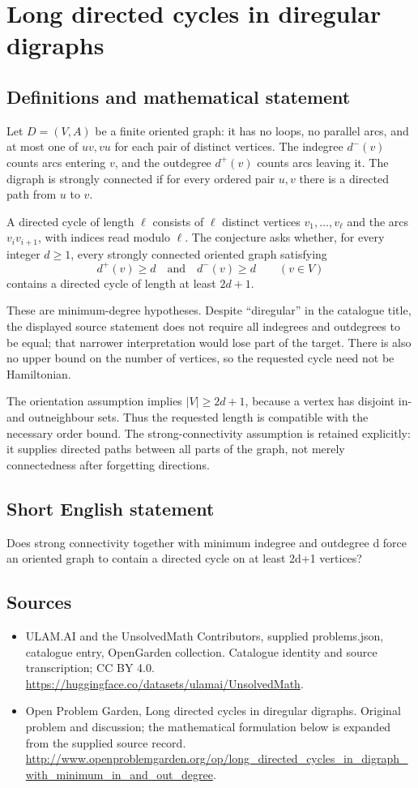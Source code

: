\documentclass[11pt,a4paper]{article}
\begin{document}
\section*{Long directed cycles in diregular digraphs}\label{statement}

\subsection{Definitions and mathematical statement}
Let $D=(V,A)$ be a finite oriented graph: it has no loops, no parallel
arcs, and at most one of $uv,vu$ for each pair of distinct vertices.
The indegree $d^-(v)$ counts arcs entering $v$, and the outdegree $d^+(v)$
counts arcs leaving it. The digraph is strongly connected if for every
ordered pair $u,v$ there is a directed path from $u$ to $v$.

A directed cycle of length $\ell$ consists of $\ell$ distinct vertices
$v_1,\ldots,v_\ell$ and the arcs $v_iv_{i+1}$, with indices read modulo
$\ell$. The conjecture asks whether, for every integer $d\ge1$, every
strongly connected oriented graph satisfying
\[
                  d^+(v)\ge d\quad\text{and}\quad d^-(v)\ge d
                  \qquad(v\in V)
\]
contains a directed cycle of length at least $2d+1$.

These are minimum-degree hypotheses. Despite ``diregular'' in the
catalogue title, the displayed source statement does not require all
indegrees and outdegrees to be equal; that narrower interpretation
would lose part of the target. There is also no upper bound on the
number of vertices, so the requested cycle need not be Hamiltonian.

The orientation assumption implies $|V|\ge2d+1$, because a vertex has
disjoint in- and outneighbour sets. Thus the requested length is compatible
with the necessary order bound. The strong-connectivity assumption is
retained explicitly: it supplies directed paths between all parts of
the graph, not merely connectedness after forgetting directions.
\subsection{Short English statement}
Does strong connectivity together with minimum indegree and outdegree d force an oriented graph to contain a directed cycle on at least 2d+1 vertices?
\subsection{Sources}
\begin{itemize}
\item[S1] ULAM.AI and the UnsolvedMath Contributors, supplied problems.json, catalogue entry, OpenGarden collection. Catalogue identity and source transcription; CC BY 4.0.
\url{https://huggingface.co/datasets/ulamai/UnsolvedMath}.
\item[S2] Open Problem Garden, Long directed cycles in diregular digraphs. Original problem and discussion; the mathematical formulation below is expanded from the supplied source record.
\url{http://www.openproblemgarden.org/op/long_directed_cycles_in_digraph_with_minimum_in_and_out_degree}.
\end{itemize}
\end{document}
